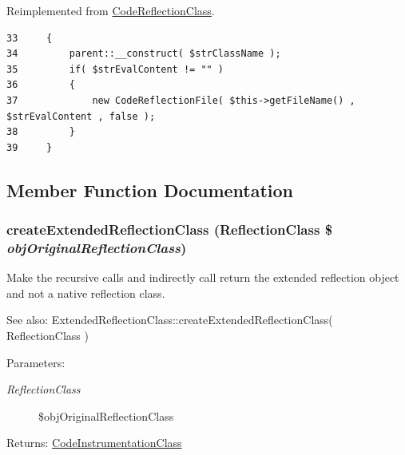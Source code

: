 Reimplemented from \hyperlink{class_code_reflection_class_4df49469648d1e8de92c18bb8ac40b1b}{CodeReflectionClass}.

\begin{Code}\begin{verbatim}33     {
34         parent::__construct( $strClassName );
35         if( $strEvalContent != "" )
36         {
37             new CodeReflectionFile( $this->getFileName() , $strEvalContent , false );
38         }
39     }
\end{verbatim}
\end{Code}




\subsection{Member Function Documentation}
\hypertarget{class_code_instrumentation_class_6b56ec198bc6a5b5a72076e4e7c19e29}{
\subsubsection[{createExtendedReflectionClass}]{\setlength{\rightskip}{0pt plus 5cm}createExtendedReflectionClass (ReflectionClass \$ {\em objOriginalReflectionClass})}}
\label{class_code_instrumentation_class_6b56ec198bc6a5b5a72076e4e7c19e29}


Make the recursive calls and indirectly call return the extended reflection object and not a native reflection class.

\begin{Desc}
\item[See also:]ExtendedReflectionClass::createExtendedReflectionClass( ReflectionClass ) \end{Desc}
\begin{Desc}
\item[Parameters:]
\begin{description}
\item[{\em ReflectionClass}]\$objOriginalReflectionClass \end{description}
\end{Desc}
\begin{Desc}
\item[Returns:]\hyperlink{class_code_instrumentation_class}{CodeInstrumentationClass} \end{Desc}


